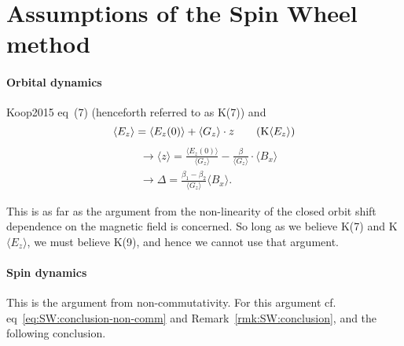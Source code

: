 \documentclass[12pt]{elsarticle}
\newcommand{\D}{\Delta}
\newcommand{\avg}[1]{\langle{#1}\rangle}
\newcommand{\Dbeta}{\beta_1 - \beta_2}
\newcommand{\aGz}{\avg{G_z}}
\begin{document}

\section{Assumptions of the Spin Wheel method}
\newcommand{\K}[1]{K(#1)}
\newcommand{\KEz}{K$\avg{E_z}$}
\paragraph{Orbital dynamics}
Koop2015 eq~(7) (henceforth referred to as \K7) and
\begin{equation}\label{eq:Assumptions:KEz}
  \avg{E_z} = \avg{E_z(0)} + \aGz\cdot z \tag{\KEz}
\end{equation}
\begin{align}
  &\rightarrow \avg{z} = \frac{\avg{E_z(0)}}{\aGz} - \frac{\beta}{\aGz}\cdot \avg{B_x} \\
  &\rightarrow \D = \frac{\Dbeta}{\aGz}\avg{B_x}.
\end{align}

This is as far as the argument from the non-linearity of the closed orbit shift dependence
on the magnetic field is concerned.
So long as we believe \K7 and \KEz, we must believe \K9, and hence we cannot use that argument.

\paragraph{Spin dynamics} This is the argument from non-commutativity.
For this argument cf. eq~\eqref{eq:SW:conclusion-non-comm} and Remark~\ref{rmk:SW:conclusion}, and
the following conclusion.
\end{document}
